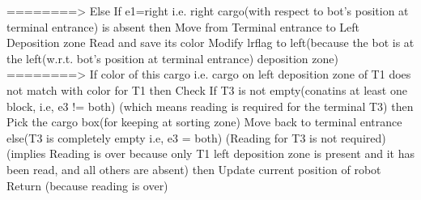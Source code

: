 {			   ========> Else If e1=right i.e. right cargo(with respect to bot's position at terminal entrance) is absent
			                then Move from Terminal entrance to Left Deposition zone
			    			     Read and save its color
			    				 Modify lrflag to left(because the bot is at the left(w.r.t. bot's position at terminal entrance) deposition zone)
			    				 ========> If color of this cargo i.e. cargo on left deposition zone of T1 does not match with color for T1
			    				              then Check If T3 is not empty(conatins at least one block, i.e, e3 != both)											
			    										     		       (which means reading is required for the terminal T3)
			    										then Pick the cargo box(for keeping at sorting zone)
			    										     Move back to terminal entrance
			    									     else(T3 is completely empty i.e, e3 = both) (Reading for T3 is not required)
			    										     (implies Reading is over because only T1 left deposition zone is present and it has been read,
			    											  and all others are absent)
			    											then Update current position of robot
			      											     Return (because reading is over)
			   
}
